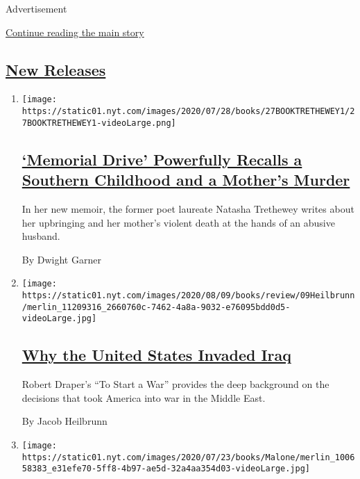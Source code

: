 Advertisement

\protect\hyperlink{after-mid1}{Continue reading the main story}

\hypertarget{new-releases}{%
\subsection{\texorpdfstring{\protect\hyperlink{}{New
Releases}}{New Releases}}\label{new-releases}}

\begin{enumerate}
\def\labelenumi{\arabic{enumi}.}
\item
  \texttt{[image: https://static01.nyt.com/images/2020/07/28/books/27BOOKTRETHEWEY1/27BOOKTRETHEWEY1-videoLarge.png]}

  \hypertarget{memorial-drive-powerfully-recalls-a-southern-childhood-and-a-mothers-murder}{%
  \subsection{\texorpdfstring{\href{/2020/07/27/books/review-memorial-drive-memoir-natasha-trethewey.html}{`Memorial
  Drive' Powerfully Recalls a Southern Childhood and a Mother's
  Murder}}{`Memorial Drive' Powerfully Recalls a Southern Childhood and a Mother's Murder}}\label{memorial-drive-powerfully-recalls-a-southern-childhood-and-a-mothers-murder}}

  In her new memoir, the former poet laureate Natasha Trethewey writes
  about her upbringing and her mother's violent death at the hands of an
  abusive husband.

  By Dwight Garner
\item
  \texttt{[image: https://static01.nyt.com/images/2020/08/09/books/review/09Heilbrunn/merlin\_11209316\_2660760c-7462-4a8a-9032-e76095bdd0d5-videoLarge.jpg]}

  \hypertarget{why-the-united-states-invaded-iraq}{%
  \subsection{\texorpdfstring{\href{/2020/07/28/books/review/to-start-a-war-robert-draper.html}{Why
  the United States Invaded
  Iraq}}{Why the United States Invaded Iraq}}\label{why-the-united-states-invaded-iraq}}

  Robert Draper's ``To Start a War'' provides the deep background on the
  decisions that took America into war in the Middle East.

  By Jacob Heilbrunn
\item
  \texttt{[image: https://static01.nyt.com/images/2020/07/23/books/Malone/merlin\_100658383\_e31efe70-5ff8-4b97-ae5d-32a4aa354d03-videoLarge.jpg]}


\end{enumerate}
